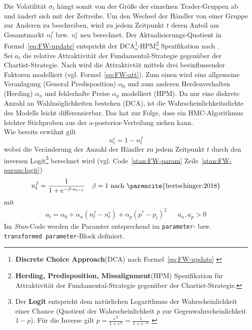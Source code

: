 \documentclass[ngerman]{ttlab-qualify}
\begin{document}
Die Volatilität $\sigma_t$ hängt somit von der Größe der einzelnen Trader-Gruppen ab und ändert sich mit der Zeitreihe. Um den Wechsel der Händler von einer Gruppe zur Anderen zu beschreiben, wird zu jedem Zeitpunkt $t$ deren Anteil am Gesamtmarkt  $n_t^f$ bzw. $n_t^c$ neu berechnet.
Der Aktualisierungs-Quotient in Formel~\ref{eq:FW-update} entspricht der DCA\footnote{\textbf{Discrete Choice Approach}(DCA) nach Formel~\ref{eq:FW-update} \parencite{bertschinger:2018}}-HPM\footnote{\textbf{Herding, Predisposition, Missalignment}(HPM) Spezifikation für Attraktivität der Fundamental-Strategie gegenüber der Chartist-Strategie\parencite{bertschinger:2018}.} Spezifikation nach \parencite{bertschinger:2018, FW:2011}.\\

Sei $a_t$ die relative Attraktivität der Fundamental-Strategie gegenüber der Chartist-Strategie. Nach \parencite{bertschinger:2018, FW:2011} wird die Attraktivtät mittels drei beeinflussender Faktoren modelliert (vgl. Formel~\ref{eq:FW-att}). 
Zum einen wird eine allgemeine Veranlagung (General Predisposition) $\alpha_0$ und zum anderen Herdenverhalten (Herding) $\alpha_n$ und fehlerhafte Preise $\alpha_p$ modelliert (HPM).
Da nur eine diskrete Anzahl an Wahlmöglichkeiten bestehen (DCA), ist die Wahrscheinlichkeitsdichte des Modells leicht differenzierbar. Das hat zur Folge, dass ein HMC-Algorithmus leichter Stichproben aus der a-posterior-Verteilung ziehen kann.\\
Wie bereits erwähnt gilt \[n_t^c = 1-n_t^f\]
wobei die Veränderung der Anzahl der Händler zu jedem Zeitpunkt $t$ durch den inversen Logit\footnote{Der \textbf{Logit} entspricht dem natürlichen Logarithmus der Wahrscheinlichkeit einer Chance (Quotient der Wahrscheinlichkeit $p$ zur Gegenwahrscheinlichkeit $1-p$). Für die Inverse gilt $p=\frac{e^X}{1+e^X}=\frac{1}{1+e^{-X}}$ \parencite{logit}} berechnet wird (vgl. Code~\ref{stan:FW-param} Zeile~\ref{stan:FW-param:logit})
\begin{align}
\label{eq:FW-update}
n_t^f =\dfrac{1}{1+e^{-\beta\cdot a_{t-1}}} && \beta = 1\text{ nach \parencite{bertschinger:2018}}
\end{align}
mit
\begin{align}
\label{eq:FW-att}
a_t= \alpha_0+\alpha_n(n_t^f-n_t^c)+\alpha_p(p^*-p_t)^2 &&a_n, a_p >0
\end{align}
Im \textit{Stan}-Code werden die Paramter entsprechend im \verb|parameter|- bzw. \verb|transformed parameter|-Block definiert.
\end{document}
